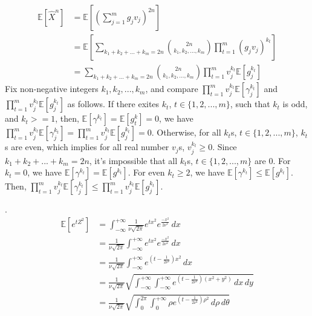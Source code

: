 \begin{align}
    \nonumber \mathbb{E}[\widehat{X}^n]&=\mathbb{E}\left[\left(\sum_{j=1}^{m}g_jv_j\right)^{2n}\right]\\
    \nonumber &=\mathbb{E}\left[\sum_{k_1+k_2+...+k_m=2n}\binom{2n}{k_1,k_2,...,k_m}\prod_{t=1}^{m}(g_jv_j)^{k_t} \right]\\
    \nonumber &=\sum_{k_1+k_2+...+k_m=2n}\binom{2n}{k_1,k_2,...,k_m}\prod_{t=1}^{m}v_j^{k_t}\mathbb{E}\left[g_j^{k_t}\right]
\end{align}
Fix non-negative integers $k_1,k_2,...,k_m$, and compare  $\prod_{t=1}^{m}v_j^{k_t}\mathbb{E}\left[\gamma_j^{k_t}\right]$ and $\prod_{t=1}^{m}v_j^{k_t}\mathbb{E}\left[g_j^{k_t}\right]$ as follows.
If there exites $k_t$, $t\in\{1,2,...,m\}$, such that $k_t$ is odd, and $k_t>=1$, then, $\mathbb{E}[\gamma^{k_t}]=\mathbb{E}[g^k_t]=0$, we have $\prod_{t=1}^{m}v_j^{k_t}\mathbb{E}\left[\gamma_j^{k_t}\right]=\prod_{t=1}^{m}v_j^{k_t}\mathbb{E}\left[g_j^{k_t}\right]=0$.
Otherwise, for all $k_t$s, $t\in\{1,2,...,m\}$, $k_t$s are even, which implies for all real number $v_j$s, $v_j^{k_t}\ge 0$. 
Since $k_1+k_2+...+k_m=2n$, it's impossible that all $k_t$s, $t\in \{1,2,...,m\}$ are 0.
For $k_t=0$, we have $\mathbb{E}[\gamma^{k_t}]=\mathbb{E}[g^{k_t}]$.
For even $k_t\ge 2$, we have $\mathbb{E}[\gamma^{k_t}]\le\mathbb{E}[g^{k_t}]$. 
Then, $\prod_{t=1}^{m}v_j^{k_t}\mathbb{E}\left[\gamma_j^{k_t}\right]\le \prod_{t=1}^{m}v_j^{k_t}\mathbb{E}\left[g_j^{k_t}\right]$.

.
\begin{align}
    \nonumber \mathbb{E}\left[ e^{tZ^2} \right]&=\int_{-\infty }^{+\infty }\frac{1}{\nu \sqrt{2\pi}}e^{tx^2}e^{\frac{-x^2}{2\nu ^2}}\,dx\\
    \nonumber &=\frac{1}{\nu \sqrt{2\pi}}\int_{-\infty }^{+\infty }e^{tx^2}e^{\frac{-x^2}{2\nu^2}}\,dx\\
    \nonumber &=\frac{1}{\nu \sqrt{2\pi}}\int_{-\infty }^{+\infty }e^{(t-\frac{1}{2\nu^2})x^2}\,dx\\
    \nonumber &=\frac{1}{\nu \sqrt{2\pi}}\sqrt{\int_{-\infty }^{+\infty }\int_{-\infty }^{+\infty }e^{(t-\frac{1}{2\nu^2})(x^2+y^2)}\,dx\,dy}\\
    \nonumber &=\frac{1}{\nu \sqrt{2\pi}}\sqrt{ \int_{0}^{2\pi}\int_{0 }^{+\infty }\rho e^{(t-\frac{1}{2\nu^2})\rho^2}\,d\rho\,d\theta   }
\end{align}

